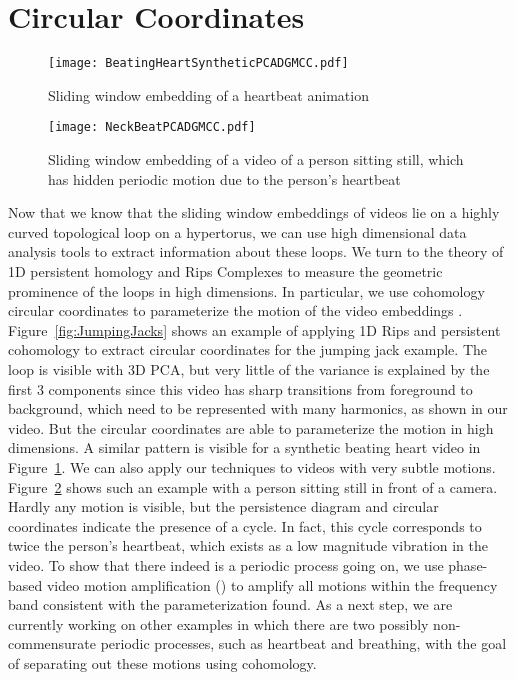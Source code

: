 \documentclass[a4paper,UKenglish]{lipics}
\begin{document}
\section{Circular Coordinates}



\begin{figure}[]
	\centering
	\texttt{[image: BeatingHeartSyntheticPCADGMCC.pdf]}
	\caption{Sliding window embedding of a heartbeat animation}
	\label{fig:BeatingHeart}
\end{figure}



\begin{figure}[]
	\centering
	\texttt{[image: NeckBeatPCADGMCC.pdf]}
	\caption{Sliding window embedding of a video of a person sitting still, which has hidden periodic motion due to the person's heartbeat}
	\label{fig:NeckBeating}
\end{figure}




Now that we know that the sliding window embeddings of videos lie on a highly curved topological loop on a hypertorus, we can use high dimensional data analysis tools to extract information about these loops.  We turn to the theory of 1D persistent homology and Rips Complexes to measure the geometric prominence of the loops in high dimensions.  In particular, we use cohomology circular coordinates to parameterize the motion of the video embeddings \cite{de2011persistent}.  Figure~\ref{fig:JumpingJacks} shows an example of applying 1D Rips and persistent cohomology to extract circular coordinates for the jumping jack example.  The loop is visible with 3D PCA, but very little of the variance is explained by the first 3 components since this video has sharp transitions from foreground to background, which need to be represented with many harmonics, as shown in our video.  But the circular coordinates are able to parameterize the motion in high dimensions.  A similar pattern is visible for a synthetic beating heart video in Figure~\ref{fig:BeatingHeart}.  We can also apply our techniques to videos with very subtle motions.  Figure~\ref{fig:NeckBeating} shows such an example with a person sitting still in front of a camera.  Hardly any motion is visible, but the persistence diagram and circular coordinates indicate the presence of a cycle.  In fact, this cycle corresponds to twice the person's heartbeat, which exists as a low magnitude vibration in the video.  To show that there indeed is a periodic process going on, we use phase-based video motion amplification (\cite{wadhwa2013phase}) to amplify all motions within the frequency band consistent with the parameterization found.  As a next step, we are currently working on other examples in which there are two possibly non-commensurate periodic processes, such as heartbeat and breathing, with the goal of separating out these motions using cohomology.
\end{document}

